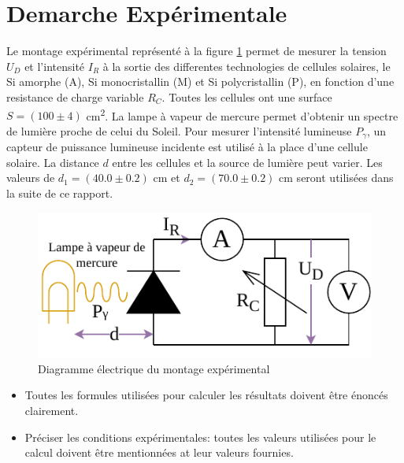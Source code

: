 \section{Demarche Expérimentale}

Le montage expérimental représenté à la figure \ref{fig:montage} permet de mesurer la tension \(U_D\) et l'intensité \(I_R\) à la sortie des differentes technologies de cellules solaires, le Si amorphe (A), Si monocristallin (M) et Si polycristallin (P), en fonction d'une resistance de charge variable \(R_C\).
Toutes les cellules ont une surface \(S = (100 \pm 4)\) \unit{\centi\meter^2}. La lampe à vapeur de mercure permet d'obtenir un spectre de lumière proche de celui du Soleil.
Pour mesurer l'intensité lumineuse \(P_\gamma\), un capteur de puissance lumineuse incidente est utilisé à la place d'une cellule solaire.
La distance \(d\) entre les cellules et la source de lumière peut varier. Les valeurs de \(d_1 = (40.0 \pm 0.2)\) \unit{\centi\meter} et \(d_2 = (70.0 \pm 0.2)\) \unit{\centi\meter} seront utilisées dans la suite de ce rapport.


\begin{figure}
    \centering
    \includegraphics[width=12cm]{figures/montage.pdf}
    \caption{Diagramme électrique du montage expérimental \cite{notice} \cite{nicole}}
    \label{fig:montage}
\end{figure}

\begin{itemize}
\item Toutes les formules utilisées pour calculer les résultats doivent être énoncés clairement.
\item Préciser les conditions expérimentales: toutes les valeurs utilisées pour le calcul doivent être mentionnées at leur valeurs fournies.
\end{itemize}
